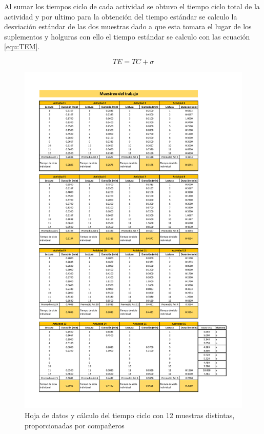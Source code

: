     Al sumar los tiempos ciclo de cada actividad se obtuvo el tiempo ciclo total de la actividad y por ultimo para la obtención del tiempo estándar se calculo la desviación estándar de las dos muestras dado a que esta tomara el lugar de los suplementos y holguras con ello el tiempo estándar se calculo con las ecuación \ref{equ:TEM}.
    
     \begin{equation}
            \label{equ:TEM}
           TE= TC + \sigma 
        \end{equation}
    
    \begin{figure}[H]
        \centering
        \includegraphics[trim = {10mm 10mm 10mm 20mm},clip,scale=0.3]{22/Img/tiempoEstandar12Muestras1.pdf}
        \caption{Hoja de datos y cálculo del tiempo ciclo con 12 muestras distintas, proporcionadas por compañeros}
        \label{fig:tiempoCiclo3}
    \end{figure}
    
